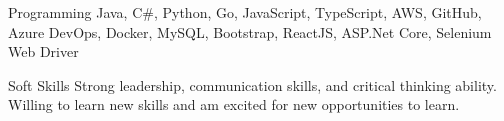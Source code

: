 


\begin{cvskills}


\cvskill
{Programming} %
{Java, C\#, Python, Go, JavaScript, TypeScript, AWS, GitHub, Azure DevOps, Docker, MySQL, Bootstrap, ReactJS, ASP.Net Core, Selenium Web Driver} %


\cvskill
{Soft Skills} %
{Strong leadership, communication skills, and critical thinking ability. Willing to learn new skills and am excited for new opportunities to learn.}

\end{cvskills}